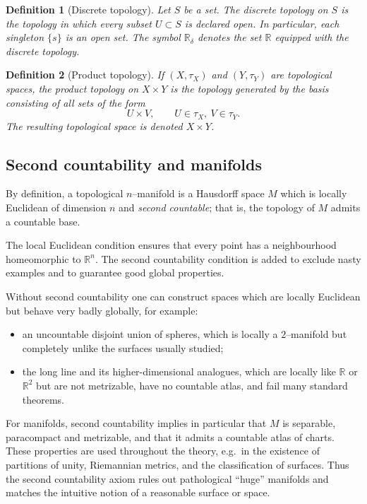 \documentclass[12pt,a4paper]{article}
\theoremstyle{plain}
\newtheorem{definition}{Definition}
\theoremstyle{definition}      %
\begin{document}
\begin{definition}[Discrete topology]
	Let $S$ be a set.  The \emph{discrete topology} on $S$ is the topology
	in which every subset $U\subset S$ is declared open.  In particular,
	each singleton $\{s\}$ is an open set.  The symbol $\mathbb{R}_\delta$
	denotes the set $\mathbb{R}$ equipped with the discrete topology.
\end{definition}

\begin{definition}[Product topology]
	If $(X,\tau_X)$ and $(Y,\tau_Y)$ are topological spaces, the
	\emph{product topology} on $X\times Y$ is the topology generated by the
	basis consisting of all sets of the form
	\[
	U\times V,\qquad U\in\tau_X,\ V\in\tau_Y.
	\]
	The resulting topological space is denoted $X\times Y$.
\end{definition}


\subsection*{Second countability and manifolds}

By definition, a topological $n$--manifold is a Hausdorff space $M$ which is
locally Euclidean of dimension $n$ and \emph{second countable}; that is, the
topology of $M$ admits a countable base.

The local Euclidean condition ensures that every point has a neighbourhood
homeomorphic to $\mathbb{R}^n$.  The second countability condition is added to
exclude nasty examples and to guarantee good global properties.

Without second countability one can construct spaces which are locally
Euclidean but behave very badly globally, for example:
\begin{itemize}
	\item an uncountable disjoint union of spheres, which is locally a
	$2$--manifold but completely unlike the surfaces usually studied;
	\item the long line and its higher-dimensional analogues, which are locally
	like $\mathbb{R}$ or $\mathbb{R}^2$ but are not metrizable, have no
	countable atlas, and fail many standard theorems.
\end{itemize}
For manifolds, second countability implies in particular that $M$ is separable,
paracompact and metrizable, and that it admits a countable atlas of charts.
These properties are used throughout the theory, e.g.\ in the existence of
partitions of unity, Riemannian metrics, and the classification of surfaces.
Thus the second countability axiom rules out pathological ``huge'' manifolds
and matches the intuitive notion of a reasonable surface or space.
\end{document}
